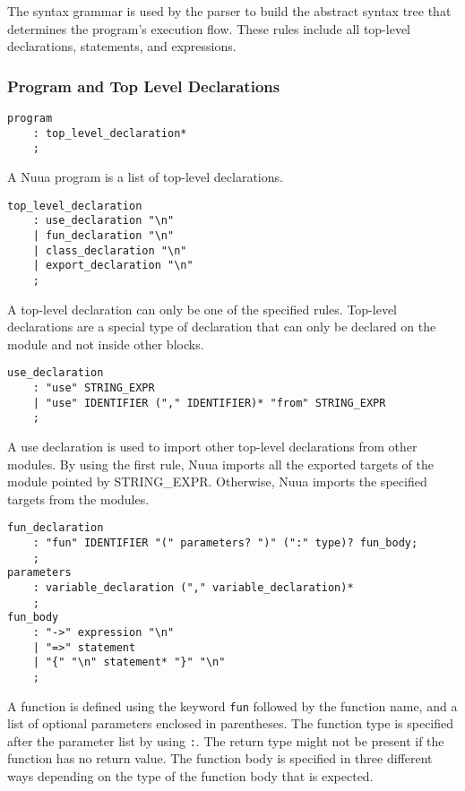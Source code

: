 The syntax grammar is used by the parser to build the abstract syntax tree that determines the program's execution flow.
These rules include all top-level declarations, statements, and expressions.

\subsubsection{Program and Top Level Declarations}
\label{sec:program_tld}

\begin{lstlisting}
program
    : top_level_declaration*
    ;
\end{lstlisting}

A Nuua program is a list of top-level declarations.

\clearpage

\begin{lstlisting}
top_level_declaration
    : use_declaration "\n"
    | fun_declaration "\n"
    | class_declaration "\n"
    | export_declaration "\n"
    ;
\end{lstlisting}

A top-level declaration can only be one of the specified rules. Top-level declarations are
a special type of declaration that can only be declared on the module and not inside other blocks.

\begin{lstlisting}
use_declaration
    : "use" STRING_EXPR
    | "use" IDENTIFIER ("," IDENTIFIER)* "from" STRING_EXPR
    ;
\end{lstlisting}

A use declaration is used to import other top-level declarations from other modules. By using the first rule, Nuua imports all the
exported targets of the module pointed by STRING\_EXPR. Otherwise, Nuua imports the specified targets from the modules.

\begin{lstlisting}
fun_declaration
    : "fun" IDENTIFIER "(" parameters? ")" (":" type)? fun_body;
    ;
parameters
    : variable_declaration ("," variable_declaration)*
    ;
fun_body
    : "->" expression "\n"
    | "=>" statement
    | "{" "\n" statement* "}" "\n"
    ;
\end{lstlisting}

A function is defined using the keyword \texttt{fun} followed by the function name, and a list of optional parameters enclosed in parentheses.
The function type is specified after the parameter list by using \texttt{:}. The return type might not be present if the function has no return value.
The function body is specified in three different ways depending on the type of the function body that is expected.

